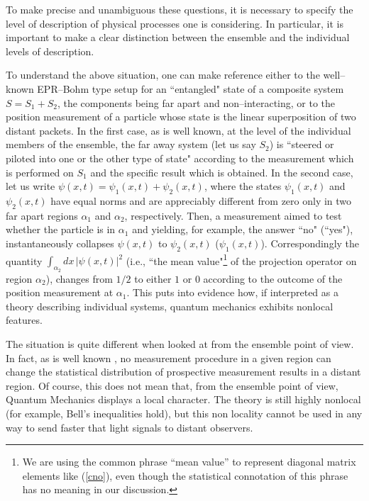 \documentclass[12pt]{article}
\begin{document}
To make precise and unambiguous these questions, it is necessary
to specify the level of description of physical processes one is
considering. In particular, it is important to make a clear
distinction between the ensemble and the individual levels of
description.

To understand the above situation, one can make reference either
to the well--known EPR--Bohm type setup for an ``entangled" state
of a composite system $S = S_{1}+ S_{2}$, the components being far
apart and non--interacting, or to the position measurement of a
particle whose state is the linear superposition of two distant
packets. In the first case, as is well known, at the level of the
individual members of the ensemble, the far away system (let us
say $S_{2}$) is \cite{sche} ``steered or piloted into one or the
other type of state" according to the measurement which is
performed on $S_{1}$ and the specific result which is obtained. In
the second case, let us write $\psi (x, t) = \psi_{1}(x, t) +
\psi_{2}(x, t)$, where the states $\psi_{1}(x, t)$ and
$\psi_{2}(x, t)$ have equal norms and are appreciably different
from zero only in two far apart regions $\alpha_{1}$ and
$\alpha_{2}$, respectively. Then, a measurement aimed to test
whether the particle is in $\alpha_{1}$ and yielding, for example,
the answer ``no" (``yes"), instantaneously collapses $\psi (x, t)$
to $\psi_{2}(x, t)$ ($\psi_{1}(x, t)$). Correspondingly the
quantity $\int_{\alpha_{2}} dx\, |\psi (x, t)|^{2}$ (i.e., ``the
mean value"\footnote{We are using the common phrase ``mean value''
to represent diagonal matrix elements like (\ref{cno}), even
though the statistical connotation of this phrase has no meaning
in our discussion.} of the projection operator on region
$\alpha_{2}$), changes from $1/2$ to either $1$ or $0$ according
to the outcome of the position measurement at $\alpha_{1}$. This
puts into evidence how, if interpreted as a theory describing
individual systems, quantum mechanics exhibits nonlocal features.

The situation is quite different when looked at from the ensemble
point of view. In fact, as is well known
\cite{heb,grwfl,gwfl,shi1}, no measurement procedure in a given
region can change the statistical distribution of prospective
measurement results in a distant region. Of course, this does not
mean that, from the ensemble point of view, Quantum Mechanics
displays a local character. The theory is still highly nonlocal
(for example, Bell's inequalities hold), but this non locality
cannot be used in any way to send faster that light signals to
distant observers.
\end{document}
